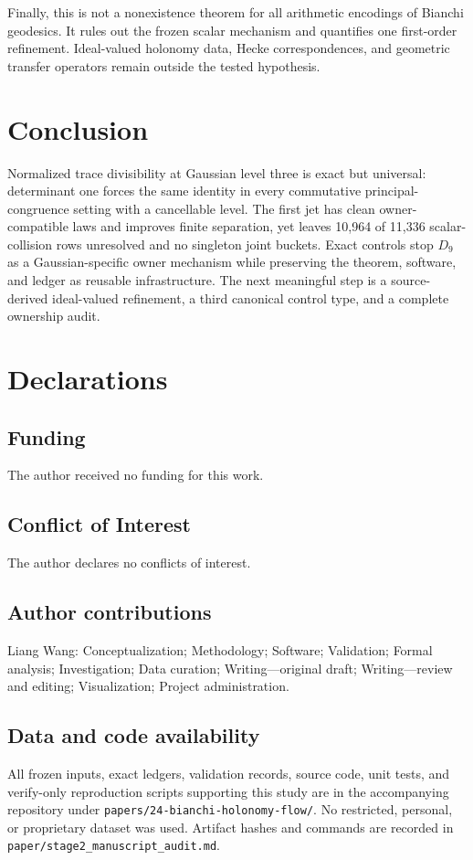 \documentclass[11pt,a4paper]{article}
\theoremstyle{definition}
\theoremstyle{remark}
\begin{document}
Finally, this is not a nonexistence theorem for all arithmetic encodings of Bianchi geodesics. It rules out the frozen scalar mechanism and quantifies one first-order refinement. Ideal-valued holonomy data, Hecke correspondences, and geometric transfer operators remain outside the tested hypothesis.

\section{Conclusion}

Normalized trace divisibility at Gaussian level three is exact but universal: determinant one forces the same identity in every commutative principal-congruence setting with a cancellable level. The first jet has clean owner-compatible laws and improves finite separation, yet leaves 10,964 of 11,336 scalar-collision rows unresolved and no singleton joint buckets. Exact controls stop \(D_9\) as a Gaussian-specific owner mechanism while preserving the theorem, software, and ledger as reusable infrastructure. The next meaningful step is a source-derived ideal-valued refinement, a third canonical control type, and a complete ownership audit.

\section*{Declarations}
\subsection*{Funding}
The author received no funding for this work.
\subsection*{Conflict of Interest}
The author declares no conflicts of interest.
\subsection*{Author contributions}
Liang Wang: Conceptualization; Methodology; Software; Validation; Formal analysis; Investigation; Data curation; Writing---original draft; Writing---review and editing; Visualization; Project administration.
\subsection*{Data and code availability}
All frozen inputs, exact ledgers, validation records, source code, unit tests, and verify-only reproduction scripts supporting this study are in the accompanying repository under \texttt{papers/24-bianchi-holonomy-flow/}. No restricted, personal, or proprietary dataset was used. Artifact hashes and commands are recorded in \texttt{paper/stage2\_manuscript\_audit.md}.
\end{document}
